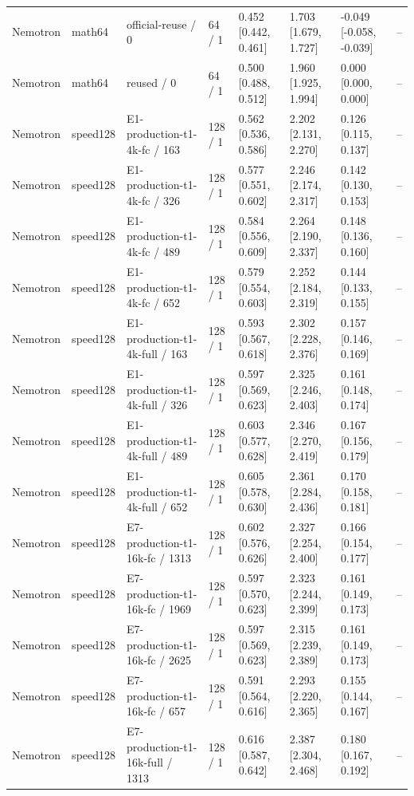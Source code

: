 \begin{tabular}{llllllll}
Nemotron & math64 & official-reuse / 0 & 64 / 1 & 0.452 [0.442, 0.461] & 1.703 [1.679, 1.727] & -0.049 [-0.058, -0.039] & -- \\
Nemotron & math64 & reused / 0 & 64 / 1 & 0.500 [0.488, 0.512] & 1.960 [1.925, 1.994] & 0.000 [0.000, 0.000] & -- \\
Nemotron & speed128 & E1-production-t1-4k-fc / 163 & 128 / 1 & 0.562 [0.536, 0.586] & 2.202 [2.131, 2.270] & 0.126 [0.115, 0.137] & -- \\
Nemotron & speed128 & E1-production-t1-4k-fc / 326 & 128 / 1 & 0.577 [0.551, 0.602] & 2.246 [2.174, 2.317] & 0.142 [0.130, 0.153] & -- \\
Nemotron & speed128 & E1-production-t1-4k-fc / 489 & 128 / 1 & 0.584 [0.556, 0.609] & 2.264 [2.190, 2.337] & 0.148 [0.136, 0.160] & -- \\
Nemotron & speed128 & E1-production-t1-4k-fc / 652 & 128 / 1 & 0.579 [0.554, 0.603] & 2.252 [2.184, 2.319] & 0.144 [0.133, 0.155] & -- \\
Nemotron & speed128 & E1-production-t1-4k-full / 163 & 128 / 1 & 0.593 [0.567, 0.618] & 2.302 [2.228, 2.376] & 0.157 [0.146, 0.169] & -- \\
Nemotron & speed128 & E1-production-t1-4k-full / 326 & 128 / 1 & 0.597 [0.569, 0.623] & 2.325 [2.246, 2.403] & 0.161 [0.148, 0.174] & -- \\
Nemotron & speed128 & E1-production-t1-4k-full / 489 & 128 / 1 & 0.603 [0.577, 0.628] & 2.346 [2.270, 2.419] & 0.167 [0.156, 0.179] & -- \\
Nemotron & speed128 & E1-production-t1-4k-full / 652 & 128 / 1 & 0.605 [0.578, 0.630] & 2.361 [2.284, 2.436] & 0.170 [0.158, 0.181] & -- \\
Nemotron & speed128 & E7-production-t1-16k-fc / 1313 & 128 / 1 & 0.602 [0.576, 0.626] & 2.327 [2.254, 2.400] & 0.166 [0.154, 0.177] & -- \\
Nemotron & speed128 & E7-production-t1-16k-fc / 1969 & 128 / 1 & 0.597 [0.570, 0.623] & 2.323 [2.244, 2.399] & 0.161 [0.149, 0.173] & -- \\
Nemotron & speed128 & E7-production-t1-16k-fc / 2625 & 128 / 1 & 0.597 [0.569, 0.623] & 2.315 [2.239, 2.389] & 0.161 [0.149, 0.173] & -- \\
Nemotron & speed128 & E7-production-t1-16k-fc / 657 & 128 / 1 & 0.591 [0.564, 0.616] & 2.293 [2.220, 2.365] & 0.155 [0.144, 0.167] & -- \\
Nemotron & speed128 & E7-production-t1-16k-full / 1313 & 128 / 1 & 0.616 [0.587, 0.642] & 2.387 [2.304, 2.468] & 0.180 [0.167, 0.192] & -- \\

\end{tabular}
